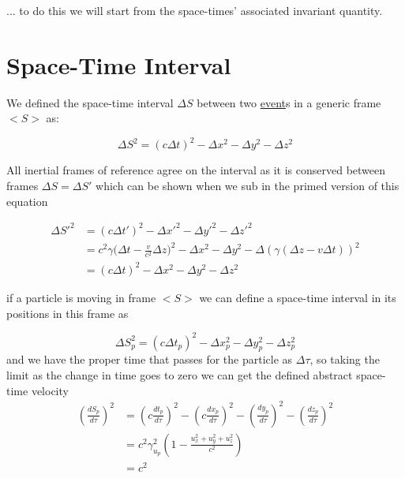 ... to do this we will start from the space-times' associated invariant quantity.

\section{Space-Time Interval}

We defined the space-time interval $\Delta S$ between two \hyperlink{def-event}{event}s in a generic frame $<S>$ as:

\begin{equation}
	\Delta S^2 = (c\Delta t)^2 -\Delta x^2 -\Delta y^2 -\Delta z^2
\end{equation}

All inertial frames of reference agree on the interval as it is conserved between frames $\Delta S=\Delta S'$ which can be shown when we sub in the primed version of this equation

\begin{equation}
	\begin{aligned}
		\Delta S'^2 &= (c\Delta t')^2 -\Delta x'^2 -\Delta y'^2 -\Delta z'^2 \\
		&= c^2\gamma \bigg( \Delta t-\frac{v}{c^2} \Delta z \bigg)^2 -\Delta x^2 -\Delta y^2 -\Delta (\gamma ( \Delta z-v \Delta t) )^2 \\
		&= (c\Delta t)^2 -\Delta x^2 -\Delta y^2 -\Delta z^2
	\end{aligned}
\end{equation}

if a particle is moving in frame $<S>$ we can define a space-time interval in its positions in this frame as

\begin{equation}
	\Delta S_p^2 = (c\Delta t_p)^2 -\Delta x_p^2 -\Delta y_p^2 -\Delta z_p^2
\end{equation}
and we have the proper time that passes for the particle as $\Delta\tau$, so taking the limit as the change in time goes to zero we can get the defined abstract space-time velocity
\begin{equation}
	\begin{aligned}
	\left(\frac{dS_p}{d\tau}\right)^2 &=  \left(c\frac{dt_p}{d\tau}\right)^2 - \left(c\frac{dx_p}{d\tau}\right)^2 - \left(\frac{dy_p}{d\tau}\right)^2 - \left(\frac{dz_p}{d\tau}\right)^2 \\
	&= c^2\gamma_{u_p}^2 \left( 1 - \frac{u_x^2 + u_y^2 + u_z^2}{c^2} \right) \\
	&= c^2
\end{aligned}
\end{equation}

